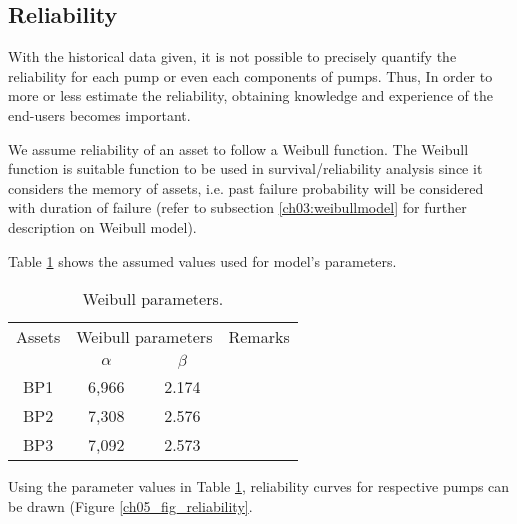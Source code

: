 \subsection{Reliability}
With the historical data given, it is not possible to precisely quantify the reliability for each pump or even each components of pumps. Thus, In order to more or less estimate the reliability, obtaining knowledge and experience of the end-users becomes important.



We assume reliability of an asset to follow a Weibull function. The Weibull function is suitable function to be used in survival/reliability analysis since it considers the memory of assets, i.e. past failure probability will be considered with duration of failure (refer to subsection \ref{ch03:weibullmodel} for further description on Weibull model).

Table \ref{ch05_tbl_weibullpara} shows the assumed values used for model's parameters.

\begin{table}[h]
	\caption{Weibull parameters.}
	\label{ch05_tbl_weibullpara}
	{\footnotesize
\begin{tabular}{c|c|c|l}
	\hline
	Assets & \multicolumn{2}{c|}{Weibull parameters} & Remarks \\ 
	\cline{2-3}
	& $\alpha$ & $\beta$ &  \\ 
	\hline
	BP1 & 6,966 & 2.174 &  \\ 
	BP2 & 7,308 & 2.576 &  \\ 
	BP3 & 7,092 & 2.573 &  \\ 
	\hline
\end{tabular}
	}
\end{table}

Using the parameter values in Table \ref{ch05_tbl_weibullpara}, reliability curves for respective pumps can be drawn (Figure \ref{ch05_fig_reliability}. %

